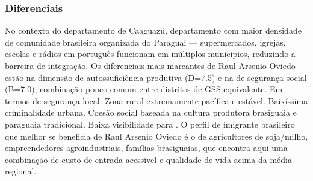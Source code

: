 \subsubsection*{Diferenciais}\label{dif-raul-arsenio-oviedo-0514}
No contexto do departamento de Caaguazú, departamento com maior densidade de comunidade brasileira organizada do Paraguai — supermercados, igrejas, escolas e rádios em português funcionam em múltiplos municípios, reduzindo a barreira de integração. Os diferenciais mais marcantes de Raul Arsenio Oviedo estão na dimensão de autossuficiência produtiva (D=7.5) e na de segurança social (B=7.0), combinação pouco comum entre distritos de GSS equivalente. Em termos de segurança local: Zona rural extremamente pacífica e estável. Baixíssima criminalidade urbana. Coesão social baseada na cultura produtora brasiguaia e paraguaia tradicional. Baixa visibilidade para . O perfil de imigrante brasileiro que melhor se beneficia de Raul Arsenio Oviedo é o de agricultores de soja/milho, empreendedores agroindustriais, famílias brasiguaias, que encontra aqui uma combinação de custo de entrada acessível e qualidade de vida acima da média regional.
